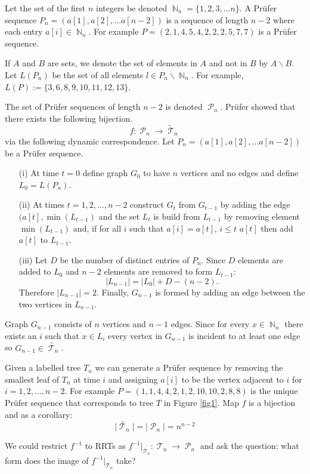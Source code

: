 \documentclass[oneside]{book} %
\theoremstyle{definition}
\numberwithin{equation}{section}
\DeclareMathOperator{\T}{\mathcal{T}}
\DeclareMathOperator{\N}{\mathbb{N}}
\DeclareMathOperator{\Pruf}{\mathcal{P}} %
\begin{document}
Let the set of the first $n$ integers be denoted $\N_n = \{1,2,3,\dots n\}$.  A Pr\"{u}fer sequence $P_n = (a[1],a[2],\dots a[n-2])$
is a sequence of length $n-2$ where each entry $a[i]\in \N_n$. For example $P = (2,1,4,5,4,2,2,2,5,7,7)$ is a Pr\"{u}fer sequence. 

If $A$ and $B$ are sets, we denote the set of elements in $A$ and not in $B$ by $A \backslash B$. Let $L(P_n)$ be the set of all elements $l \in P_n \backslash \N_n$.  For example, $L(P) := \{3,6,8,9,10,11,12,13\}$.

The set of Pr\"{u}fer sequences of length $n-2$ is denoted $\Pruf_n$.  Pr\"{u}fer showed that there exists the following bijection. 
\[
  f: \Pruf_n \rightarrow\tilde{\T}_n 
\]
via the following dynamic correspondence.  Let $P_n = (a[1],a[2],\dots a[n-2])$ be a Pr\"{u}fer sequence.
\begin{itemize}
 \item[(i)] At time $t=0$ define graph $G_0$ to have $n$  vertices and no edges and  define $L_0 = L(P_n)$. 
 \item[(ii)] At times $t=1,2,\dots, n-2$ construct $G_t$ from $G_{t-1}$  by adding the edge $(a[t],\min(L_{t-1})$ and the set $L_t$
 is build from $L_{t-1}$ by removing element $\min(L_{t-1})$ and, if for all $i$ such that $a[i] = a[t]$, $i \leq t$ $a[t]$ then add $a[t]$ to $L_{t-1}$.
 \item[(iii)]Let $D$ be the number of distinct entries of $P_{n}$. Since $D$ elements are added to $L_{0}$ and $n-2$ elements are removed
to form $L_{t-1}$:
\[|L_{n-1}| = |L_{0}| + D - (n-2).\]
Therefore $|L_{n-1}| = 2$. Finally, $G_{n-1}$ is formed by adding an edge between the two vertices in $ 
L_{n-1}$.
\end{itemize}
Graph $G_{n-1}$ consists of $n$ vertices and $n-1$ edges.  Since for every $x \in \N_{n}$ there exists an $i$ such that $x \in L_i$ every vertex in $G_{n-1}$ is incident to at least one edge so $G_{n-1} \in \tilde{\T_n}$.  

Given a labelled tree $T_n$ we can generate a Pr\"{u}fer sequence by removing the smallest leaf of $T_n$ at time $i$ and assigning $a[i]$ to be the vertex adjacent to $i$ for $i = 1,2,\dots,n-2$. For example $P = (1,1,4,4,2,1,2,10,10,2,8,8)$ is the unique Pr\"{u}fer sequence that corresponds to tree $T$ in Figure \ref{fig1}. Map  $f$ is a bijection and as a corollary:
\[
 \lvert \tilde{\T_n} \rvert  = \lvert \Pruf_n \rvert  = n^{n-2} 
\]

We could restrict $f^{-1}$ to RRTs as $f^{-1} |_{\T_n}: \T_n \rightarrow \Pruf_n$ and ask the question: what form does the image of $f^{-1} |_{\T_n}$ take? 
\end{document}
